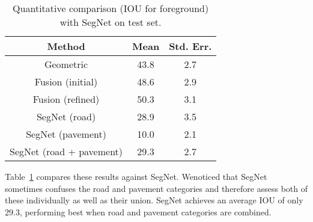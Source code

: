 \documentclass[10pt,twocolumn,letterpaper]{article}
\begin{document}
\begin{table}
\begin{center}
\caption{Quantitative comparison (IOU for foreground) with SegNet on test set.}
\begin{tabular}{|c|c|c|}
\hline
Method & Mean & Std. Err.\\
\hline\hline
Geometric & 43.8 & 2.7 \\
Fusion (initial) & 48.6 & 2.9 \\
Fusion (refined) & 50.3 & 3.1 \\
SegNet (road) & 28.9 & 3.5 \\
SegNet (pavement) & 10.0 & 2.1 \\
SegNet (road + pavement) & 29.3 & 2.7 \\
\hline
\end{tabular}
\end{center}
\label{Tab:experiment}
\end{table}
Table~\ref{Tab:experiment} compares these results against SegNet. Wenoticed that SegNet sometimes confuses the road and pavement categories and therefore assess both of these individually as well as their union. SegNet achieves an average IOU of only 29.3, performing best when road and pavement categories are combined\cite{Almazan2016Road}.

\end{document}
